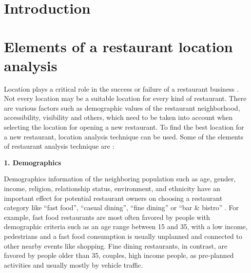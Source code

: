 \documentclass[a4paper, 11pt, oneside]{Thesis}  %
\begin{document}



\mainmatter	  %
\pagestyle{fancy}  %


\chapter{Introduction}

\chapter{Elements of a restaurant location analysis}
\label{elements}

Location plays a critical role in the success or failure of a restaurant business \cite{Tzeng.2002} \cite{Parsa.2005} \cite{Camillo.2008}. Not every location may be a suitable location for every kind of restaurant. There are various factors such as demographic values of the restaurant neighborhood, accessibility, visibility and others, which need to be taken into account when selecting the location for opening a new restaurant. To find the best location for a new restaurant, location analysis technique can be used. Some of the elements of restaurant analysis technique are \cite{EvanTarver.21.04.2017} \cite{Webstaurantstore.com.25.07.2018}:


 \textbf{1.	Demographics}

Demographics information of the neighboring population such as age, gender, income, religion, relationship status, environment, and ethnicity have an important effect for potential restaurant owners on choosing a restaurant category like “fast food”, “casual dining”, “fine dining” or “bar \& bistro” \cite{EvanTarver.21.04.2017}. For example, fast food restaurants are most often favored by people with demographic criteria such as an age range between 15 and 35, with a low income, pedestrians and a fast food consumption is usually unplanned and connected to other nearby events like shopping. Fine dining restaurants, in contrast, are favored by people older than 35, couples, high income people, as pre-planned activities and usually mostly by vehicle traffic.
\end{document}
